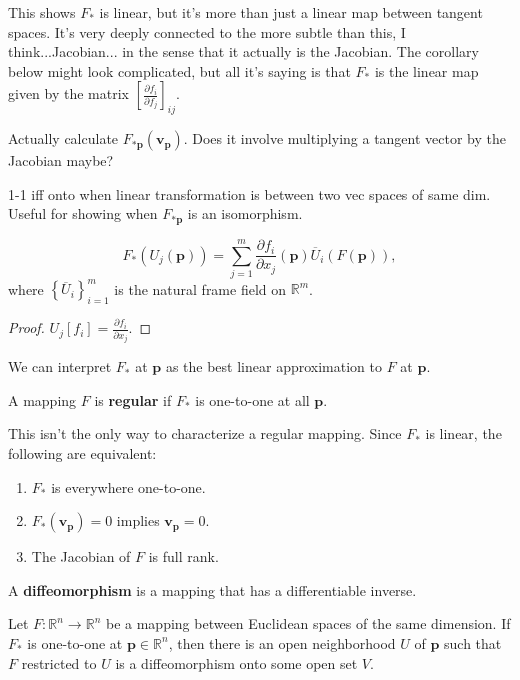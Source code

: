 \documentclass[10pt]{report}
\begin{document}
This shows $F_*$ is linear, but it's more than just a linear map between tangent spaces. It's very deeply connected to the {\color{red}more subtle than this, I think...}Jacobian... in the sense that it actually is the Jacobian. The corollary below might look complicated, but all it's saying is that $F_*$ is the linear map given by the matrix $[\frac{\partial f_i}{\partial f_j} ]_{ij}.$

{\color{red}Actually calculate $F_{*\mathbf{p}}(\mathbf{v}_{\mathbf{p}})$. Does it involve multiplying a tangent vector by the Jacobian maybe?}

{\color{red}1-1 iff onto when linear transformation is between two vec spaces of same dim. Useful for showing when $F_{*\mathbf{p}}$ is an isomorphism.}

\begin{cor}
\[
	F_{*}(U_j(\mathbf{p})) = \sum_{j=1}^{m} \frac{\partial f_i}{\partial x_j} (\mathbf{p}) \overline{U}_{i}(F(\mathbf{p})),
\] where $\left\{ \overline{U}_i \right\}_{i=1}^m$ is the natural frame field on $\mathbb{R}^m$.
\end{cor}
\begin{proof}
	$U_j[f_i] = \frac{\partial f_i}{\partial x_j} .$
\end{proof}

\begin{note}
We can interpret $F_*$ at $\mathbf{p}$ as the best linear approximation to $F$ at $\mathbf{p}$.
\end{note}

\begin{defn}[]
A mapping $F$ is \textbf{regular} if $F_*$ is one-to-one at all $\mathbf{p}$.
\end{defn}

This isn't the only way to characterize a regular mapping. Since $F_*$ is linear, the following are equivalent:
\begin{enumerate}
	\item $F_*$ is everywhere one-to-one.
	\item $F_*(\mathbf{v}_{\mathbf{p}}) = 0$ implies $\mathbf{v}_{\mathbf{p}}=0.$ 
	\item The Jacobian of $F$ is full rank.
\end{enumerate}

\begin{defn}[]
	A \textbf{diffeomorphism} is a mapping that has a differentiable inverse.
\end{defn}

\begin{thrm}
Let $F:\mathbb{R}^n\to \mathbb{R}^n$ be a mapping between Euclidean spaces of the same dimension. If $F_*$ is one-to-one at $\mathbf{p}\in \mathbb{R}^n$, then there is an open neighborhood $U$ of $\mathbf{p}$ such that $F$ restricted to $U$ is a diffeomorphism onto some open set $V$.
\end{thrm}
\end{document}
